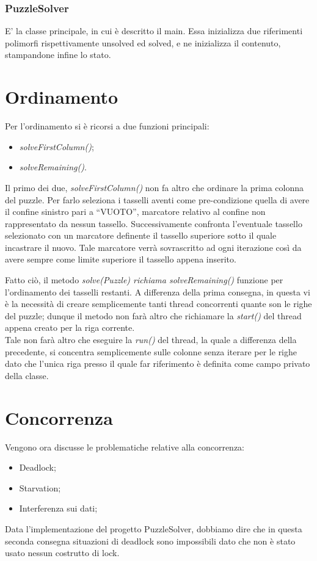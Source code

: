 \documentclass[11pt]{article}
\begin{document}
\subsubsection{PuzzleSolver}
E' la classe principale, in cui è descritto il main. Essa inizializza due riferimenti polimorfi rispettivamente unsolved ed solved, e ne inizializza il contenuto, stampandone infine lo stato.
\section{Ordinamento}
Per l'ordinamento si è ricorsi a due funzioni principali:
\begin{itemize}
    \item \textit{solveFirstColumn()};
    \item \textit{solveRemaining()}.
\end{itemize}
Il primo dei due, \textit{solveFirstColumn()} non fa altro che ordinare la prima colonna del puzzle. Per farlo seleziona i tasselli aventi come pre-condizione quella di avere il confine sinistro pari a ``VUOTO'', marcatore relativo al confine non rappresentato da nessun tassello. Successivamente confronta l'eventuale tassello selezionato con un marcatore definente il tassello superiore sotto il quale incastrare il nuovo. Tale marcatore verrà sovrascritto ad ogni iterazione così da avere sempre come limite superiore il tassello appena inserito.

Fatto ciò, il metodo \textit{solve(Puzzle) \emph{richiama} solveRemaining()} funzione per l'ordinamento dei tasselli restanti.
A differenza della prima consegna, in questa vi è la necessità di creare semplicemente tanti thread concorrenti quante son le righe del puzzle; dunque il metodo non farà altro che richiamare la \textit{start()} del thread appena creato per la riga corrente.\\Tale non farà altro che eseguire la \textit{run()} del thread, la quale a differenza della precedente, si concentra semplicemente sulle colonne senza iterare per le righe dato che l'unica riga presso il quale far riferimento è definita come campo privato della classe.
\section{Concorrenza}
Vengono ora discusse le problematiche relative alla concorrenza:
\begin{itemize}
    \item Deadlock;
    \item Starvation;
    \item Interferenza sui dati;
\end{itemize}
Data l'implementazione del progetto PuzzleSolver, dobbiamo dire che in questa seconda consegna situazioni di deadlock sono impossibili dato che non è stato usato nessun costrutto di lock.
\end{document}
